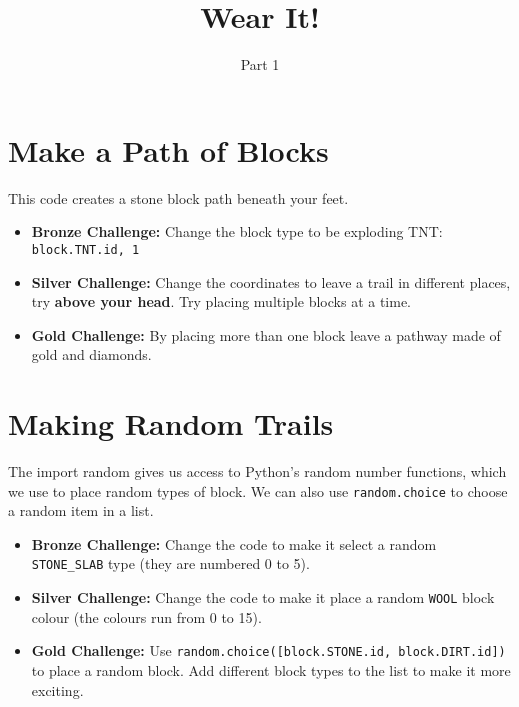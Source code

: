 \documentclass{geocraft-worksheet}
\begin{document}
\title{Wear It!}
\subtitle{Part 1}

\date{}

\maketitle


\section{Make a Path of Blocks}
\lstset{language=Python}

\noindent%
%
\vspace{0.2cm}
%
%

\noindent This code creates a stone block path beneath your feet.

\begin{itemize}
\item\textbf{Bronze Challenge:} Change the block type to be exploding TNT: \lstinline{block.TNT.id, 1}

\item\textbf{Silver Challenge:} Change the coordinates to leave a trail in different places, try 
    \textbf{above your head}. Try placing multiple blocks at a time.

\item\textbf{Gold Challenge:} By placing more than one block leave a pathway made of gold and diamonds. 

\end{itemize}


\section{Making Random Trails}\vspace{-0.5cm}


\noindent%
%
\vspace{0.1cm}
%
%

\noindent The import random gives us access to Python's random number functions, which we use to place random types of
block. We can also use \lstinline{random.choice} to choose a random item in a list.

\begin{itemize}
\item\textbf{Bronze Challenge:} Change the code to make it select a random \lstinline{STONE_SLAB} type (they are
numbered 0 to 5).

\item\textbf{Silver Challenge:} Change the code to make it place a random \lstinline{WOOL} block colour (the colours run
from 0 to 15).

\item\textbf{Gold Challenge:} Use \lstinline{random.choice([block.STONE.id, block.DIRT.id])}  to place a random
block. Add different block types to the list to make it more exciting.
\end{itemize}
\end{document}
